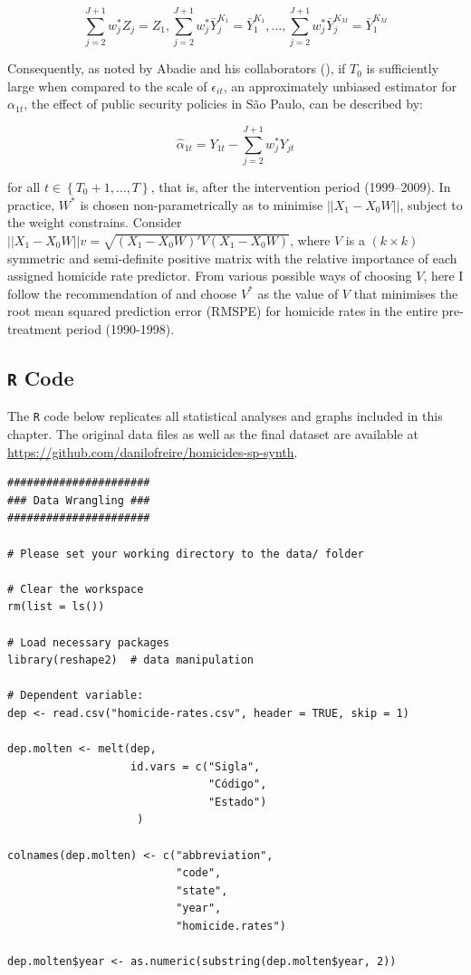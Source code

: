$$\sum_{j = 2}^{J + 1} w_{j}^{*} Z_{j} = Z_{1}, \sum_{j = 2}^{J + 1} w_{j}^{*}\bar{Y}_{j}^{K_{1}} = \bar{Y}_{1}^{K_{1}}, \dots, \sum_{j = 2}^{J + 1} w_{j}^{*}\bar{Y}_{j}^{K_{M}} = \bar{Y}_{1}^{K_{M}}$$ 

Consequently, as noted by Abadie and his collaborators (\citeyear{abadie2010}), if $T_{0}$ is sufficiently large when compared to the scale of $\epsilon_{it}$, an approximately unbiased estimator for $\alpha_{1t}$, the effect of public security policies in São Paulo, can be described by:

$$\hat{\alpha}_{1t} = Y_{1t} - \sum_{j = 2}^{J + 1} w_{j}^{*} Y_{jt}$$

for all $t \in \left\{T_{0} + 1, \dots, T \right\}$, that is, after the intervention period (1999--2009). In practice, $W^{*}$ is chosen non-parametrically as to minimise $||X_{1} - X_{0}W||$, subject to the weight constrains. Consider $||X_{1} - X_{0}W||v = \sqrt{(X_{1} - X_{0}W)'V (X_{1} - X_{0}W)}$, where $V$ is a $(k \times k)$ symmetric and semi-definite positive matrix with the relative importance of each assigned homicide rate predictor. From various possible ways of choosing $V$, here I follow the recommendation of \citet{abadie2003} and choose $V^{*}$ as the value of $V$ that minimises the root mean squared prediction error (RMSPE) for homicide rates in the entire pre-treatment period (1990-1998).


\subsection{\texttt{R} Code}
\label{sec:synth-code}

The \texttt{R} code below replicates all statistical analyses and graphs included in this chapter. The original data files as well as the final dataset are available at \href{https://github.com/danilofreire/homicides-sp-synth}{https://github.com/danilofreire/homicides-sp-synth}. 

\singlespacing
\small
\begin{verbatim}
######################
### Data Wrangling ###
######################

# Please set your working directory to the data/ folder

# Clear the workspace
rm(list = ls())

# Load necessary packages
library(reshape2)  # data manipulation

# Dependent variable:
dep <- read.csv("homicide-rates.csv", header = TRUE, skip = 1)

dep.molten <- melt(dep,
                   id.vars = c("Sigla",
                               "Código",
                               "Estado")
                    )

colnames(dep.molten) <- c("abbreviation",
                          "code",
                          "state",
                          "year",
                          "homicide.rates")

dep.molten$year <- as.numeric(substring(dep.molten$year, 2))
\end{verbatim}

